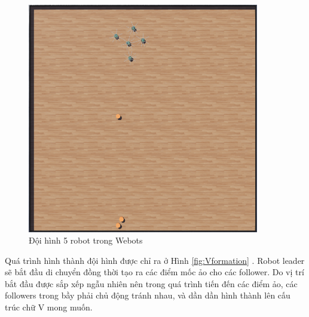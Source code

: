 \begin{figure}[H]
    \centering
    \includegraphics[width=0.9\textwidth]{chapter5/image/Webot.png}
    \caption{Đội hình 5 robot trong Webots}
    \label{fig:5Robot}
\end{figure}


Quá trình hình thành đội hình được chỉ ra ở Hình \ref{fig:Vformation} . Robot leader sẽ bắt đầu di chuyển đồng thời tạo ra các điểm mốc ảo cho các follower. Do vị trí bắt đầu được sắp xếp ngẫu nhiên nên trong quá trình tiến đến các điểm ảo, các followers trong bầy phải chủ động tránh nhau, và dần dần hình thành lên cấu trúc chữ V mong muốn.


